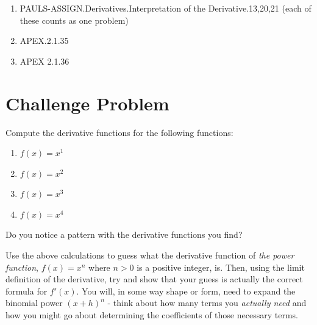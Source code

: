 \documentclass[12pt]{article}
\begin{document}
\begin{enumerate}
  \item PAULS-ASSIGN.Derivatives.Interpretation of the Derivative.13,20,21 (each of these counts as one problem)
  \item APEX.2.1.35
  \item APEX 2.1.36
\end{enumerate}

\section{Challenge Problem}
Compute the derivative functions for the following functions:
\begin{enumerate}
  \item $f(x) = x^1$
  \item $f(x) = x^2$
  \item $f(x) = x^3$
  \item $f(x) = x^4$
\end{enumerate}
Do you notice a pattern with the derivative functions you find?

Use the above calculations to guess what the derivative function of
\textit{the power function}, $f(x) = x^n$ where $n > 0$ is a positive integer, is.
Then, using the limit definition of the derivative, try and show that your guess is actually the correct formula for $f'(x)$.
You will, in some way shape or form, need to expand the 
binomial power $(x + h)^n$ - think about how many terms you \textit{actually need} and how you might go about determining the coefficients of those necessary terms.



\end{document}
